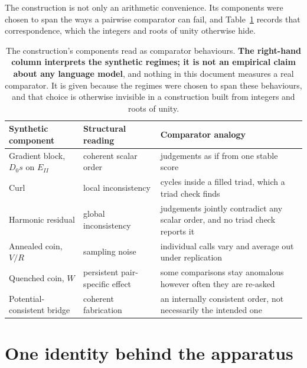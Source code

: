 \documentclass[11pt,a4paper]{article}
\theoremstyle{definition}
\theoremstyle{remark}
\begin{document}
\noindent
The construction is not only an arithmetic convenience. Its components were
chosen to span the ways a pairwise comparator can fail, and Table~\ref{tab:modes}
records
that correspondence, which the integers and roots of unity otherwise hide.

\begin{table}[h]
\centering\small
\begin{tabular}{@{}p{}p{}p{}@{}}
\toprule
Synthetic component & Structural reading & Comparator analogy \\
\midrule
Gradient block, $D_0s$ on $E_{II}$ & coherent scalar order & judgements as if from one stable score \\
Curl & local inconsistency & cycles inside a filled triad, which a triad check finds \\
Harmonic residual & global inconsistency & judgements jointly contradict any scalar order, and no triad check reports it \\
Annealed coin, $V/R$ & sampling noise & individual calls vary and average out under replication \\
Quenched coin, $W$ & persistent pair-specific effect & some comparisons stay anomalous however often they are re-asked \\
Potential-consistent bridge & coherent fabrication & an internally consistent order, not necessarily the intended one \\
\bottomrule
\end{tabular}
\caption{The construction's components read as comparator behaviours.
\textbf{The right-hand column interprets the synthetic regimes; it is not an
empirical claim about any language model}, and nothing in this document measures
a real comparator. It is given because the regimes were chosen to span these
behaviours, and that choice is otherwise invisible in a construction built from
integers and roots of unity.\label{tab:modes}}
\end{table}

\section{One identity behind the apparatus}
\end{document}
